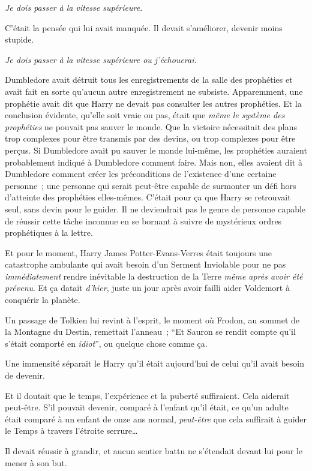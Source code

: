 \emph{Je dois passer à la vitesse supérieure.}

C'était la pensée qui lui avait manquée. Il devait s'améliorer, devenir moins stupide.

\emph{Je dois passer à la vitesse supérieure ou j'échouerai.}

Dumbledore avait détruit tous les enregistrements de la salle des prophéties et avait fait en sorte qu'aucun autre enregistrement ne subsiste. Apparemment, une prophétie avait dit que Harry ne devait pas consulter les autres prophéties. Et la conclusion évidente, qu'elle soit vraie ou pas, était que \emph{même le système des prophéties} ne pouvait pas sauver le monde. Que la victoire nécessitait des plans trop complexes pour être transmis par des devins, ou trop complexes pour être perçus. Si Dumbledore avait pu sauver le monde lui-même, les prophéties auraient probablement indiqué à Dumbledore comment faire. Mais non, elles avaient dit à Dumbledore comment créer les préconditions de l'existence d'une certaine personne~; une personne qui serait peut-être capable de surmonter un défi hors d'atteinte des prophéties elles-mêmes. C'était pour ça que Harry se retrouvait seul, sans devin pour le guider. Il ne deviendrait pas le genre de personne capable de réussir cette tâche inconnue en se bornant à suivre de mystérieux ordres prophétiques à la lettre.

Et pour le moment, Harry James Potter-Evans-Verres était toujours une catastrophe ambulante qui avait besoin d'un Serment Inviolable pour ne pas \emph{immédiatement} rendre inévitable la destruction de la Terre \emph{même après avoir été prévenu}. Et ça datait \emph{d'hier}, juste un jour après avoir failli aider Voldemort à conquérir la planète.

Un passage de Tolkien lui revint à l'esprit, le moment où Frodon, au sommet de la Montagne du Destin, remettait l'anneau~; “Et Sauron se rendit compte qu'il s'était comporté en \emph{idiot}”, ou quelque chose comme ça.

Une immensité séparait le Harry qu'il était aujourd'hui de celui qu'il avait besoin de devenir.

Et il doutait que le temps, l'expérience et la puberté suffiraient. Cela aiderait peut-être. S'il pouvait devenir, comparé à l'enfant qu'il était, ce qu'un adulte était comparé à un enfant de onze ans normal, \emph{peut-être} que cela suffirait à guider le Temps à travers l'étroite serrure…

Il devait réussir à grandir, et aucun sentier battu ne s'étendait devant lui pour le mener à son but.


